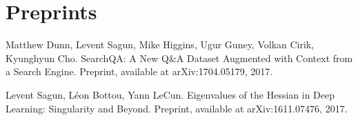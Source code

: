 \documentclass[10pt,letterpaper]{article}
\renewenvironment{itemize}
{
\begin{list}{}{\setlength{\leftmargin}{1.5em}}
}
{
  \end{list}
}
\begin{document}
\section*{Preprints}
\begin{itemize}

\item Matthew Dunn, Levent Sagun, Mike Higgins, Ugur Guney, Volkan Cirik, Kyunghyun Cho. SearchQA: A New Q\&A Dataset Augmented with Context from a Search Engine. Preprint, available at arXiv:1704.05179, 2017.

\item Levent Sagun, L\'eon Bottou, Yann LeCun. Eigenvalues of the Hessian in Deep Learning: Singularity and Beyond. Preprint, available at arXiv:1611.07476, 2017.
\end{itemize}

\end{document}
